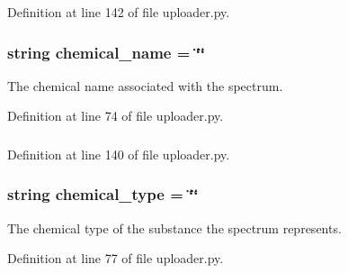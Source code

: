 Definition at line 142 of file uploader.py.\hypertarget{classuploader_1_1_spectrum_transfer_aa1e794a67e21e2ca4e9c935115286ade}{
\subsubsection[{chemical\_\-name}]{\setlength{\rightskip}{0pt plus 5cm}string {\bf chemical\_\-name} = \char`\"{}\char`\"{}}}
\label{classuploader_1_1_spectrum_transfer_aa1e794a67e21e2ca4e9c935115286ade}


The chemical name associated with the spectrum. 

Definition at line 74 of file uploader.py.\hypertarget{classuploader_1_1_spectrum_transfer_ab23a1bfe0956557e254961031d578c23}{
\subsubsection[{chemical\_\-type}]{}}
\label{classuploader_1_1_spectrum_transfer_ab23a1bfe0956557e254961031d578c23}


Definition at line 140 of file uploader.py.\hypertarget{classuploader_1_1_spectrum_transfer_ae46b0845841ed97a5c489a8e05cb2514}{
\subsubsection[{chemical\_\-type}]{\setlength{\rightskip}{0pt plus 5cm}string {\bf chemical\_\-type} = \char`\"{}\char`\"{}}}
\label{classuploader_1_1_spectrum_transfer_ae46b0845841ed97a5c489a8e05cb2514}


The chemical type of the substance the spectrum represents. 

Definition at line 77 of file uploader.py.\hypertarget{classuploader_1_1_spectrum_transfer_aa6082c83a20a90e5a2ab9f216961972f}{
\subsubsection[{contents}]{}}
\label{classuploader_1_1_spectrum_transfer_aa6082c83a20a90e5a2ab9f216961972f}


